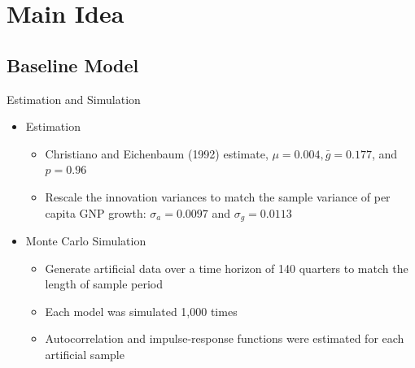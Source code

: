 \documentclass[10pt]{beamer}
\begin{document}
\section{Main Idea}
\subsection{Baseline Model}

\begin{frame}{Estimation and Simulation}
    \begin{itemize}
        \item Estimation
            \begin{itemize}
                \item Christiano and Eichenbaum (1992) estimate, $\mu = 0.004, \bar{g} = 0.177$, and $p = 0.96$
                \item Rescale the innovation variances to match the sample variance of per capita GNP growth: $\sigma_a = 0.0097$ and $\sigma_g = 0.0113$
            \end{itemize}
        \item Monte Carlo Simulation
            \begin{itemize}
                \item Generate artificial data over a time horizon of 140 quarters to match the length of sample period
                \item Each model was simulated 1,000 times
                \item Autocorrelation and impulse-response functions were estimated for each artificial sample
            \end{itemize}
        
    \end{itemize}
\end{frame}
\end{document}
